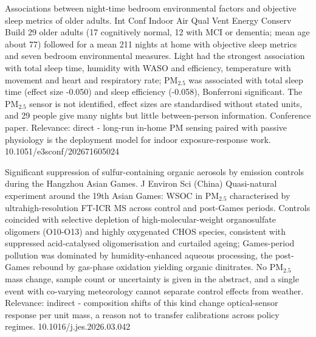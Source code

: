 \documentclass[10pt]{article}
\begin{document}
{Associations between night-time bedroom environmental factors and objective sleep metrics of older adults.}
{Int Conf Indoor Air Qual Vent Energy Conserv Build}
{29 older adults (17 cognitively normal, 12 with MCI or dementia; mean age about 77) followed for a mean 211 nights at home with objective sleep metrics and seven bedroom environmental measures. Light had the strongest association with total sleep time, humidity with WASO and efficiency, temperature with movement and heart and respiratory rate; PM$_{2.5}$ was associated with total sleep time (effect size -0.050) and sleep efficiency (-0.058), Bonferroni significant. The PM$_{2.5}$ sensor is not identified, effect sizes are standardised without stated units, and 29 people give many nights but little between-person information. Conference paper. Relevance: direct - long-run in-home PM sensing paired with passive physiology is the deployment model for indoor exposure-response work.}
{10.1051/e3sconf/202671605024}

\par{}\baselineskip{}\baselineskip
{}

{Significant suppression of sulfur-containing organic aerosols by emission controls during the Hangzhou Asian Games.}
{J Environ Sci (China)}
{Quasi-natural experiment around the 19th Asian Games: WSOC in PM$_{2.5}$ characterised by ultrahigh-resolution FT-ICR MS across control and post-Games periods. Controls coincided with selective depletion of high-molecular-weight organosulfate oligomers (O10-O13) and highly oxygenated CHOS species, consistent with suppressed acid-catalysed oligomerisation and curtailed ageing; Games-period pollution was dominated by humidity-enhanced aqueous processing, the post-Games rebound by gas-phase oxidation yielding organic dinitrates. No PM$_{2.5}$ mass change, sample count or uncertainty is given in the abstract, and a single event with co-varying meteorology cannot separate control effects from weather. Relevance: indirect - composition shifts of this kind change optical-sensor response per unit mass, a reason not to transfer calibrations across policy regimes.}
{10.1016/j.jes.2026.03.042}
\end{document}
